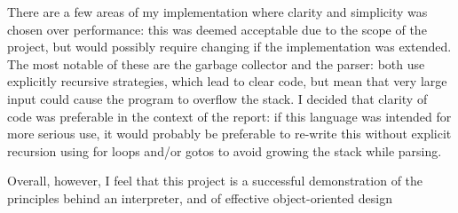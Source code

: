\documentclass[12pt]{article}
\begin{document}
There are a few areas of my implementation where clarity and simplicity was chosen over performance: this was deemed acceptable due to the scope of the project,
but would possibly require changing if the implementation was extended. The
most notable of these are the garbage collector and the parser: both use
explicitly recursive strategies, which lead to clear code, but mean that very large input could cause the program to overflow the stack. I decided that
clarity of code was preferable in the context of the report: if this language
was intended for more serious use, it would probably be preferable to re-write
this without explicit recursion using for loops and/or gotos to avoid growing the stack while parsing.

Overall, however, I feel that this project is a successful demonstration of the principles behind an interpreter, and of effective object-oriented design
\end{document}
